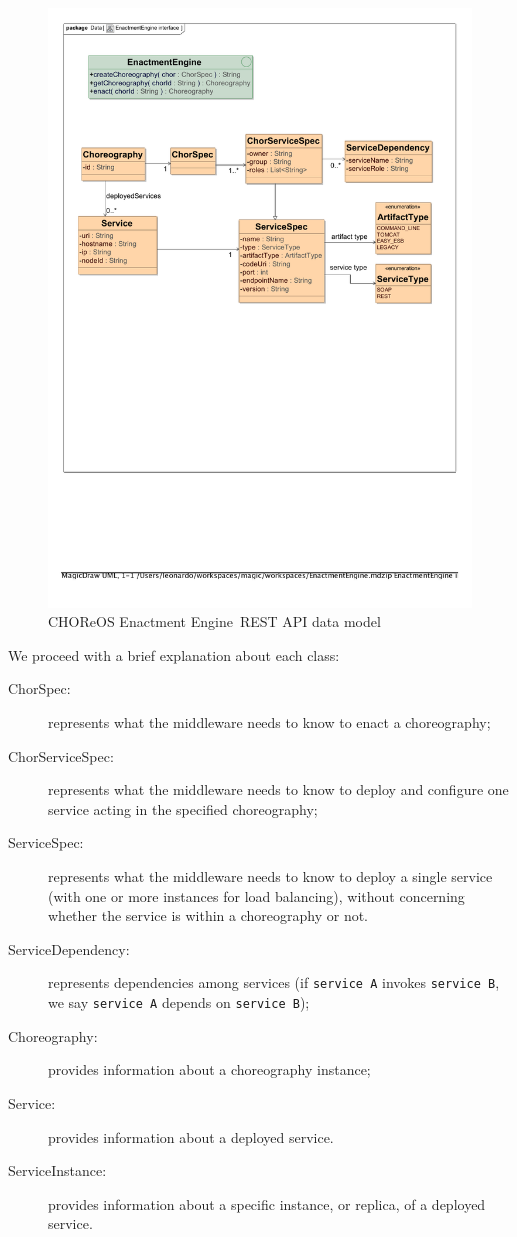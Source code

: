 \documentclass[a4paper, 10pt]{article}
\newcommand{\ee}{CHOReOS Enactment Engine}
\begin{document}
\begin{figure}
\centering
\includegraphics[scale=0.75]{img/data_model.pdf}
\caption{\ee\ REST API data model}
\label{img:data_model}
\end{figure}

We proceed with a brief explanation about each class:

\begin{description}
\item [ChorSpec:] represents what the middleware needs to know to enact a choreography;
\item [ChorServiceSpec:] represents what the middleware needs to know to deploy and configure one service acting in the specified choreography;
\item [ServiceSpec:] represents what the middleware needs to know to deploy a single service (with one or more instances for load balancing), without concerning whether the service is within a choreography or not. 
\item [ServiceDependency:] represents dependencies among services (if \verb!service A! invokes \verb!service B!, we say \verb!service A! depends on \verb!service B!);
\item [Choreography:] provides information about a choreography instance; 
\item [Service:] provides information about a deployed service. 
\item [ServiceInstance:] provides information about a specific instance, or replica, of a deployed service. 
\end{description}
\end{document}
